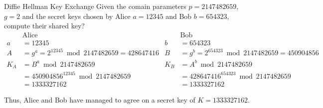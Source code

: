 \begin{example}{Diffie Hellman Key Exchange}
  Given the comain parameters $p = 2147482659$, $g = 2$ and the secret keys chosen by Alice $a = 12345$ and Bob $b = 654323$, compute their shared key?
  \tcblower{}
  \begin{align*}
    &\text{Alice} & &\text{Bob} \\
    a &= 12345 & b &=654323 \\
    A &= g^{a} = 2^{12345} \bmod 2147482659 = 428647416 & B &= g^{b} = 2^{654323} \bmod 2147482659 = 450904856 \\
    K_{A} &= B^{a} \bmod 2147482659 & K_{B} &= A^{b} \bmod 2147482659\\
    &= 450904856^{12345} \bmod 2147482659 & &= 428647416^{654323} \bmod 2147482659 \\
    &= 1333327162 & &= 1333327162
  \end{align*}

  Thus, Alice and Bob have managed to agree on a secret key of $K=1333327162$.
\end{example}

